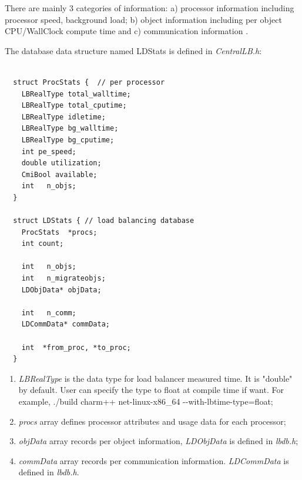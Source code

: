There are mainly 3 categories of information: a) processor information including processor speed, background load; b) object information including per object
CPU/WallClock compute time and c) communication information .

The database data structure named {\kw LDStats} is defined in {\em CentralLB.h}:

\begin{verbatim}

  struct ProcStats {  // per processor
    LBRealType total_walltime;
    LBRealType total_cputime;
    LBRealType idletime;
    LBRealType bg_walltime;
    LBRealType bg_cputime;
    int pe_speed;
    double utilization;
    CmiBool available;
    int   n_objs;
  }

  struct LDStats { // load balancing database
    ProcStats  *procs;
    int count;

    int   n_objs;
    int   n_migrateobjs;
    LDObjData* objData;

    int   n_comm;
    LDCommData* commData;

    int  *from_proc, *to_proc;
  }

\end{verbatim}

\begin{enumerate}
\item {\em LBRealType} is the data type for load balancer measured time. It is "double" by default. User can specify the type to float at \charmpp{} compile time if want. For example, ./build charm++ net-linux-x86\_64 {-}{-}with-lbtime-type=float;
\item {\em procs} array defines processor attributes and usage data for each
processor;
\item {\em objData} array records per object information, {\em LDObjData} is defined in {\em lbdb.h};
\item {\em commData} array records per communication information. {\em LDCommData} is defined in {\em lbdb.h}.
\end{enumerate}

